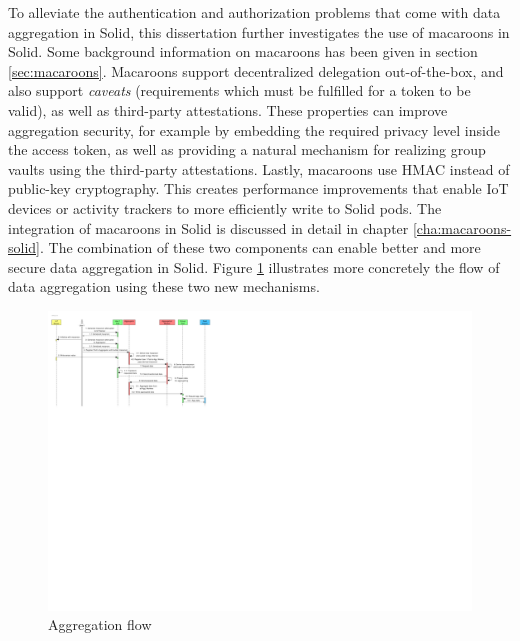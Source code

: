 To alleviate the authentication and authorization problems that come with data aggregation in Solid, this dissertation further investigates the use of macaroons in Solid. Some background information on macaroons has been given in section \ref{sec:macaroons}. Macaroons support decentralized delegation out-of-the-box, and also support \textit{caveats} (requirements which must be fulfilled for a token to be valid), as well as third-party attestations. These properties can improve aggregation security, for example by embedding the required privacy level inside the access token, as well as providing a natural mechanism for realizing group vaults using the third-party attestations. Lastly, macaroons use \acrlong{HMAC} instead of public-key cryptography. This creates performance improvements that enable IoT devices or activity trackers to more efficiently write to Solid pods. The integration of macaroons in Solid is discussed in detail in chapter \ref{cha:macaroons-solid}. The combination of these two components can enable better and more secure data aggregation in Solid. Figure \ref{fig:aggregation-flow} illustrates more concretely the flow of data aggregation using these two new mechanisms.

\begin{figure}
    \centering
    \includegraphics[width=1.0\textwidth]{images/architecture/InteractionDiagram-Aggregation-flow.pdf}
    \caption{Aggregation flow}
    \label{fig:aggregation-flow}
\end{figure}

